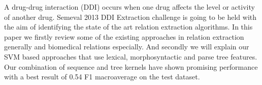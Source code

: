 A drug-drug interaction (DDI) occurs when one drug affects the level or activity of another drug. Semeval 2013 DDI Extraction challenge is going to be
 held with the aim of identifying the state of the art relation extraction
 algorithms.
 In this paper we firstly review some of the existing approaches in relation
 extraction generally and biomedical relations especially. And secondly we will
 explain our SVM based approaches that use lexical, morphosyntactic and parse
 tree features. Our combination of sequence and tree kernels have shown
 promising performance with a best result of 0.54 F1 macroaverage on the test
 dataset.

